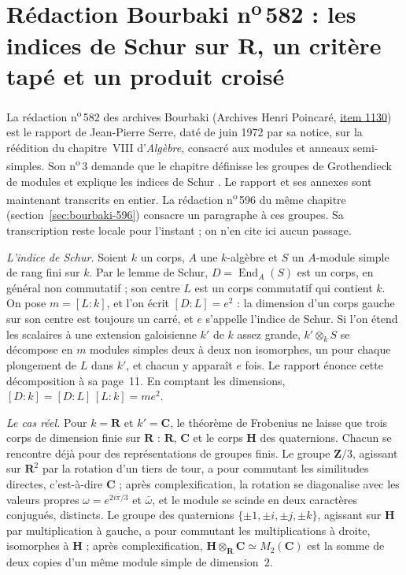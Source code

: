 \section[Rédaction Bourbaki n\textsuperscript{o}\,582 : les indices de Schur sur $\mathbf R$]{Rédaction Bourbaki n\textsuperscript{o}\,582 : les indices de Schur sur $\mathbf R$, un critère tapé et un produit croisé\protect{}}\label{sec:bourbaki-582}

La rédaction n\textsuperscript{o}\,582 des archives Bourbaki (Archives Henri Poincaré, \href{https://archives-bourbaki.ahp-numerique.fr/items/show/1130}{item 1130}) est le rapport de Jean-Pierre Serre, daté de juin 1972 par sa notice, sur la réédition du chapitre~VIII d'\emph{Algèbre}, consacré aux modules et anneaux semi-simples. Son n\textsuperscript{o}\,3 demande que le chapitre définisse les groupes de Grothendieck de modules et explique les indices de Schur . Le rapport et ses annexes sont maintenant transcrits en entier. La rédaction n\textsuperscript{o}\,596 du même chapitre (section~\ref{sec:bourbaki-596}) consacre un paragraphe à ces groupes. Sa transcription reste locale pour l'instant ; on n'en cite ici aucun passage.

\emph{L'indice de Schur.} Soient $k$ un corps, $A$ une $k$-algèbre et $S$ un $A$-module simple de rang fini sur $k$. Par le lemme de Schur, $D = \operatorname{End}_A(S)$ est un corps, en général non commutatif ; son centre $L$ est un corps commutatif qui contient $k$. On pose $m = [L : k]$, et l'on écrit $[D : L] = e^2$ : la dimension d'un corps gauche sur son centre est toujours un carré, et $e$ s'appelle l'indice de Schur. Si l'on étend les scalaires à une extension galoisienne $k'$ de $k$ assez grande, $k' \otimes_k S$ se décompose en $m$ modules simples deux à deux non isomorphes, un pour chaque plongement de $L$ dans $k'$, et chacun y apparaît $e$ fois. Le rapport énonce cette décomposition à sa page~11. En comptant les dimensions, $[D : k] = [D : L]\,[L : k] = m e^2$.

\emph{Le cas réel.} Pour $k = \mathbf R$ et $k' = \mathbf C$, le théorème de Frobenius ne laisse que trois corps de dimension finie sur $\mathbf R$ : $\mathbf R$, $\mathbf C$ et le corps $\mathbf H$ des quaternions. Chacun se rencontre déjà pour des représentations de groupes finis. Le groupe $\mathbf Z/3$, agissant sur $\mathbf R^2$ par la rotation d'un tiers de tour, a pour commutant les similitudes directes, c'est-à-dire $\mathbf C$ ; après complexification, la rotation se diagonalise avec les valeurs propres $\omega = e^{2i\pi/3}$ et $\bar\omega$, et le module se scinde en deux caractères conjugués, distincts. Le groupe des quaternions $\{\pm 1, \pm i, \pm j, \pm k\}$, agissant sur $\mathbf H$ par multiplication à gauche, a pour commutant les multiplications à droite, isomorphes à $\mathbf H$ ; après complexification, $\mathbf H \otimes_{\mathbf R} \mathbf C \simeq M_2(\mathbf C)$ est la somme de deux copies d'un même module simple de dimension~$2$.

